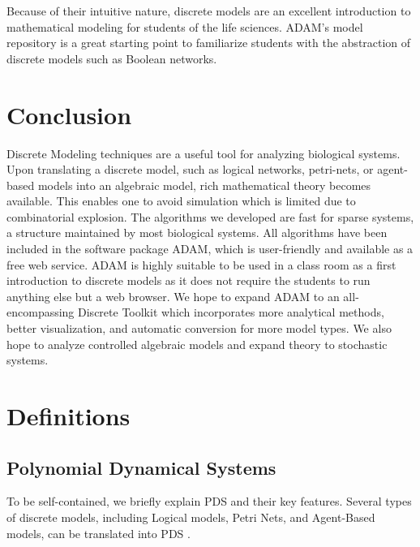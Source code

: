 \documentclass[11pt]{amsart}
\begin{document}
 
Because of their intuitive nature, discrete models are an excellent introduction to mathematical modeling for students of the life sciences. ADAM's model repository is a great starting point to familiarize students with the abstraction of discrete models such as Boolean networks.
\section{Conclusion}
Discrete Modeling techniques are a useful tool for analyzing biological
systems. Upon translating a discrete model, such as logical networks,
petri-nets, or agent-based models into an algebraic model, rich mathematical
theory becomes available. This enables one to
avoid simulation which is limited due to combinatorial explosion. The algorithms
we developed are fast for sparse systems, a structure maintained by most biological
systems. All algorithms have been included in the software package ADAM\cite{ADAM},
which is user-friendly and available as a free web service.
ADAM is highly suitable to be used in a class room as a first
introduction to discrete models as it does not require the students to run
anything else but a web browser.
We hope to expand ADAM to an all-encompassing Discrete Toolkit which incorporates more
analytical methods, better visualization, and automatic conversion for more model types.
We also hope to analyze controlled algebraic models and expand theory to stochastic systems.
\appendix
\section{Definitions}
\subsection{Polynomial Dynamical Systems}
To be self-contained, we briefly explain PDS and their key features.
Several types of discrete models, including Logical models, Petri
Nets, and Agent-Based models, can be translated into PDS \cite{Alan:Bioinf2010,Hinkelmann:2010}.
\end{document}
